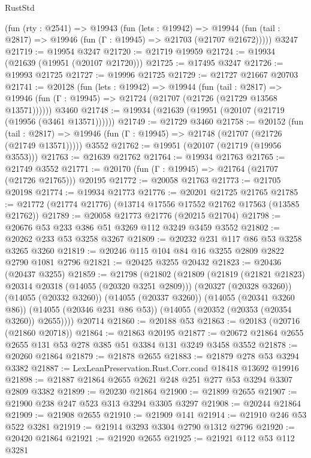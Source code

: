 \begin{lexlean}{RustStd}
\begin{coremodule}
    (fun (rty : @2541) =>
    @19943
      (fun (lets : @19942) =>
      @19944 (fun (tail : @2817) => @19946 (fun (Γ : @19945) => @21703 (@21707 @21672)))))
    @3247
@21719 := @19954 @3247
@21720 := @21719 @19959
@21724 := @19934 (@21639 (@19951 (@20107 @21720)))
@21725 := @17495 @3247
@21726 := @19993 @21725
@21727 := @19996 @21725
@21729 := @21727 @21667 @20703
@21741 := @20128
    (fun (lets : @19942) =>
    @19944
      (fun (tail : @2817) =>
      @19946 (fun (Γ : @19945) => @21724 (@21707 (@21726 (@21729 @13568 @13571))))))
    @3460
@21748 := @19934 (@21639 (@19951 (@20107 (@21719 (@19956 (@3461 @13571))))))
@21749 := @21729 @3460
@21758 := @20152
    (fun (tail : @2817) => @19946 (fun (Γ : @19945) => @21748 (@21707 (@21726 (@21749 @13571)))))
    @3552
@21762 := @19951 (@20107 (@21719 (@19956 @3553)))
@21763 := @21639 @21762
@21764 := @19934 @21763
@21765 := @21749 @3552
@21771 := @20170 (fun (Γ : @19945) => @21764 (@21707 (@21726 @21765))) @20195
@21772 := @20058 @21763
@21773 := @21705 @20198
@21774 := @19934 @21773
@21776 := @20201 @21725 @21765
@21785 := @21772 (@21774 @21776) (@13714 @17556 @17552 @21762 @17563 (@13585 @21762))
@21789 := @20058 @21773 @21776 (@20215 @21704)
@21798 := @20676 @53 @233 @386 @51 @3269 @112 @3249 @3459 @3552
@21802 := @20262 @233 @53 @3258 @3267
@21809 := @20232 @231 @117 @86 @53 @3258 @3265 @3260
@21819 := @20246 @115 @104 @84 @16 @3255 @2809 @2822 @2790 @1081 @2796
@21821 := @20425 @3255 @20432
@21823 := @20436 (@20437 @3255)
@21859 := @21798
    (@21802
      (@21809
        (@21819 (@21821 @21823) @20314 @20318 (@14055 (@20320 @3251 @2809)))
        (@20327 (@20328 @3260))
        (@14055 (@20332 @3260))
        (@14055 (@20337 @3260))
        (@14055 (@20341 @3260 @86))
        (@14055 (@20346 @231 @86 @53))
        (@14055 (@20352 (@20353 (@20354 @3260)) @2655))))
    @20714
@21860 := @20188 @53
@21863 := @20183 (@20716 (@21860 @20718))
@21864 := @21863 @20195
@21877 := @20672 @21864 @2655 @2655 @131 @53 @278 @385 @51 @3384 @131 @3249 @3458 @3552
@21878 := @20260 @21864
@21879 := @21878 @2655
@21883 := @21879 @278 @53 @3294 @3382
@21887 := LexLeanPreservation.Rust.Corr.cond @18418 @13692 @19916
@21898 := @21887 @21864 @2655 @2621 @248 @251 @277 @53 @3294 @3307 @2809 @3382
@21899 := @20230 @21864
@21900 := @21899 @2655
@21907 := @21900 @238 @247 @523 @313 @3294 @3305 @3297
@21908 := @20244 @21864
@21909 := @21908 @2655
@21910 := @21909 @141
@21914 := @21910 @246 @53 @522 @3281
@21919 := @21914 @3293 @3304 @2790 @1312 @2796
@21920 := @20420 @21864
@21921 := @21920 @2655
@21925 := @21921 @112 @53 @112 @3281

\end{coremodule}
\end{lexlean}
